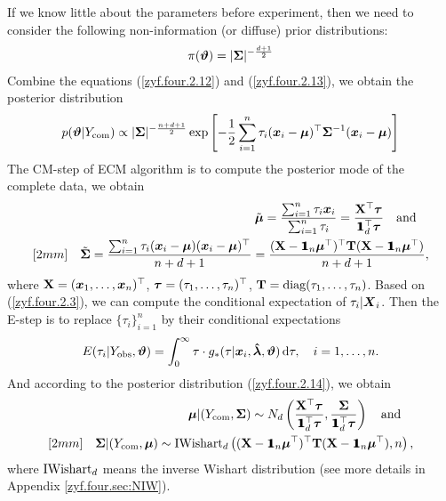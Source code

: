 If we know little about the parameters before experiment, then we need to consider the following non-information (or diffuse) prior distributions:
\begin{eqnarray}    \label{zyf.four.2.13}
    \pi(\boldsymbol{\vartheta}) = |{\mbox{\boldmath$\Sigma$}}|^{-\frac{d+1}{2}}
\end{eqnarray}
Combine the equations (\ref{zyf.four.2.12}) and (\ref{zyf.four.2.13}), we obtain the posterior distribution
\begin{eqnarray}    \label{zyf.four.2.14}
    p(\boldsymbol{\vartheta} | Y_{\rm com}) \propto |{\mbox{\boldmath$\Sigma$}}|^{-\frac{n+d+1}{2}} \exp\left[ -\frac{1}{2}\sum_{i=1}^n \tau_i ({\boldsymbol{x}}_i - {\boldsymbol{\mu}})^\top {\mbox{\boldmath$\Sigma$}}^{-1} ({\boldsymbol{x}}_i - {\boldsymbol{\mu}}) \right]
\end{eqnarray}
The CM-step of ECM algorithm is to compute the posterior mode of the complete data, we obtain
\begin{eqnarray*}
    && \tilde{\bmu} = \frac{\sum_{i=1}^n \tau_i \ibx_i}{\sum_{i=1}^n \tau_i} = \frac{\bX^\top \btau}{\1_d^\top \btau} \qand \\ [2mm]
    && \tilde{\bSi} = \frac{\sum_{i=1}^n \tau_i (\ibx_i - \bmu)(\ibx_i - \bmu)^\top}{n + d + 1} = \frac{(\bX - \1_n \bmu^\top)^\top \bT (\bX - \1_n \bmu^\top)}{n + d + 1},
\end{eqnarray*}
where ${\bf X} = ({\boldsymbol{x}}_1, \dots, {\boldsymbol{x}}_n)^\top$, $\boldsymbol{\tau} = (\tau_1, \dots, \tau_n)^\top$, ${\bf T} = \mbox{diag}(\tau_1, \dots, \tau_n)$. Based on (\ref{zyf.four.2.3}), we can compute the conditional expectation of $\tau_i | {\boldsymbol{X}}_i$. Then the E-step is to replace $\{\tau_i\}_{i=1}^n$ by their conditional expectations
$$
    E(\tau_i | Y_{\rm obs}, \boldsymbol{\vartheta}) = \int_0^\infty \tau \cdot g_*(\tau | {\boldsymbol{x}}_i, \mbox{\boldmath${\hat \lambda}$}, \boldsymbol{\vartheta}) \,\mbox{d} \tau, \quad i = 1, \dots, n.
$$
And according to the posterior distribution (\ref{zyf.four.2.14}), we obtain
\begin{eqnarray}
    && \bmu | (\Y{com}, \bSi) \sim N_d\left( \frac{\bX^\top \btau}{\1_d^\top \btau}, \frac{\bSi}{\1_d^\top \btau} \right) \qand \label{zyf.four.2.15} \\ [2mm]
    && \bSi | (\Y{com}, \bmu) \sim \IWishart_d\left( (\bX - \1_n \bmu^\top)^\top \bT (\bX - \1_n \bmu^\top), n \right), \label{zyf.four.2.16}
\end{eqnarray}
where $\mbox{IWishart}_d$ means the inverse Wishart distribution (see more details in Appendix \ref{zyf.four.sec:NIW}).

